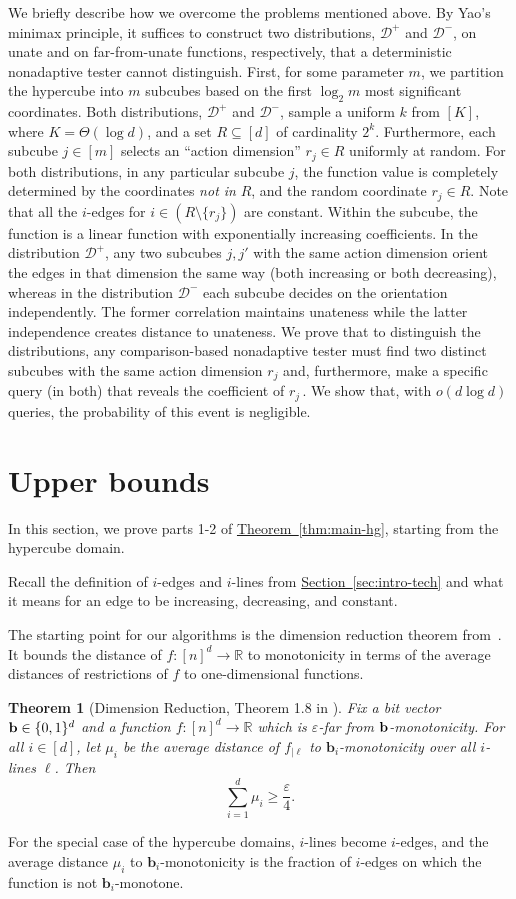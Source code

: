 \documentclass[11pt]{article}
\numberwithin{equation}{section}
\newtheorem{theorem}{Theorem}[section]
\theoremstyle{definition}
\theoremstyle{plain}
\newcommand{\R}{\mathbb R}
\newcommand{\expref}[2]{\hyperref[#2]{#1~\ref{#2}}}
\newcommand{\eps}{\varepsilon}
\newcommand{\bb}{\ensuremath{\mathbf{b}}}
\newcommand{\totcube}{\ensuremath{m}}
\newcommand{\Yes}{\ensuremath{\mathcal{D}^+}}
\newcommand{\No}{\ensuremath{\mathcal{D}^-}}
\newcommand{\Sec}[1]{\expref{Section}{sec:#1}}
\newcommand{\Thm}[1]{\expref{Theorem}{thm:#1}}
\begin{document}
We briefly describe how we overcome the problems mentioned above.
By Yao's minimax principle, it suffices to construct two distributions,
%
$\Yes$ and $\No$, on unate and
%
on  %
far-from-unate functions,   %
%
respectively, %
that a deterministic nonadaptive tester cannot distinguish.
First, for some parameter $m$, we partition the hypercube
into $\totcube$ subcubes based 
%
%
on 
%
the first $\log_2\totcube$ most significant coordinates.
Both distributions, $\Yes$ and $\No$, sample a uniform $k$ from $[K]$, where $K=\Theta(\log d)$, and a set $R\subseteq[d]$ of cardinality $2^k$.
Furthermore, each subcube $j\in [\totcube]$ selects an ``action dimension'' $r_j\in R$ uniformly at random. For both distributions, in any particular subcube $j$, the function value is completely determined by the coordinates \emph{not in} $R$, and the random coordinate $r_j\in R$. Note that all the $i$-edges for $i\in (R\setminus \{r_j\})$ are constant.
Within the subcube, the function is a linear function
with exponentially increasing coefficients.
In the distribution $\Yes$, any two subcubes $j,j'$ with the same action dimension orient the edges in that dimension the same  way (both increasing or both decreasing), whereas in the distribution $\No$ each subcube decides on the orientation independently.
The former correlation maintains unateness while the 
latter independence creates distance to unateness.
We prove that to distinguish the distributions,
any comparison-based nonadaptive tester must find two distinct subcubes
with the same action dimension $r_j$ and, furthermore, make a specific
%
query (in both) that reveals the coefficient of $r_j$\,.
%
We show that, with $o(d\log d)$ queries, the probability of this event is negligible.

\section{Upper bounds}\label{sec:upper-bounds}
In this section, we prove parts 1-2 of \Thm{main-hg}, starting from the hypercube domain.

Recall the definition of $i$-edges and $i$-lines from \Sec{intro-tech} and what it means for an edge to be increasing, decreasing, and constant.

The starting point for our algorithms is the dimension reduction theorem from~\cite{CDJS17}. It bounds the distance of $f:[n]^d \to \R$ to monotonicity in terms of
the %
average distances of restrictions of $f$ to one-dimensional functions.
%
\begin{theorem}[Dimension Reduction, Theorem 1.8 in \cite{CDJS17}] \label{thm:dimred} Fix a bit vector ${\bf b}\in\{0,1\}^d$ and a function $f:[n]^d \to \R$ which is $\eps$-far from ${\bf b}$-monotonicity.
	For all $i\in[d]$, let $\mu_i$ be the average distance of $f_{|\ell}$ to $\bb_i$-monotonicity over all $i$-lines $\ell$.
	Then \[\sum_{i=1}^d \mu_i \geq \frac{\eps}{4}.\]
\end{theorem}
For the special case of the hypercube domains, $i$-lines become $i$-edges, and the average distance $\mu_i$ to $\bb_i$-monotonicity is the fraction of $i$-edges on which the function is not $\bb_i$-monotone.
\end{document}
